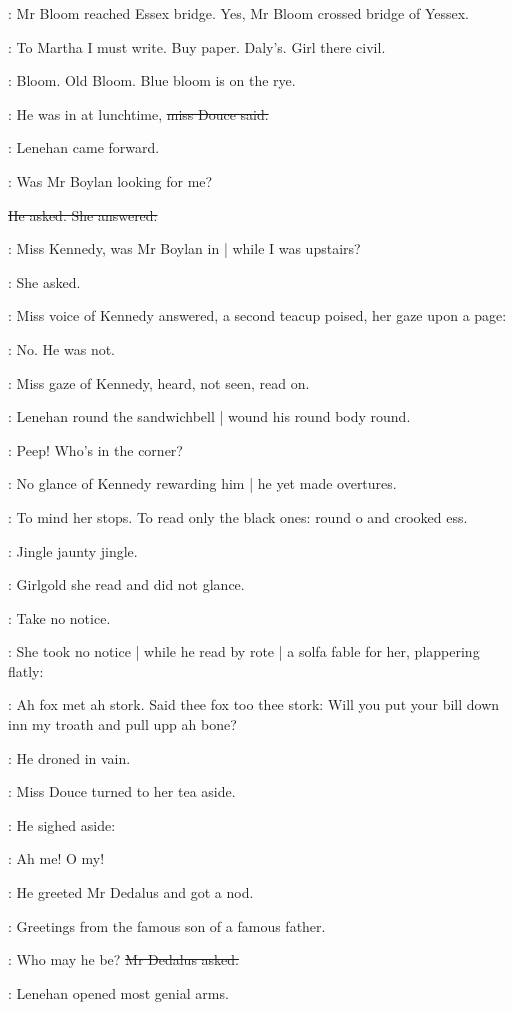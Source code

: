 :
Mr Bloom reached Essex bridge.
Yes,
Mr Bloom crossed bridge of Yessex.

\BloomInt:
To Martha I must write.
Buy paper.
Daly's.
Girl there civil.

:
Bloom.
Old Bloom.
Blue bloom is on the rye.

\MissD:
He was in at lunchtime,
\sout{miss Douce said.}

:
Lenehan came forward.

\lenehan:
Was Mr Boylan looking for me?

\sout{He asked.
She answered:}

\MissD:
Miss Kennedy,
was Mr Boylan in |
while I was upstairs?

:
She asked.

:
Miss voice of Kennedy answered,
a second teacup poised,
her gaze upon a page:

\MissK:
No.
He was not.

:
Miss gaze of Kennedy,
heard,
not seen,
read on.

:
Lenehan round the sandwichbell |
wound his round body round.

\lenehan:
Peep!
Who's in the corner?

:
No glance of Kennedy rewarding him |
he yet made overtures.

:
To mind her stops.
To read only the black ones:
round o and crooked ess.

:
Jingle jaunty jingle.

:
Girlgold she read and did not glance.

\MissK:
Take no notice.

:
She took no notice |
while he read by rote |
a solfa fable for her,
plappering flatly:

\lenehan:
Ah fox met ah stork.
Said thee fox too thee stork:
Will you put your bill down inn my troath
and pull upp ah bone?

:
He droned in vain.

:
Miss Douce turned to her tea aside.

:
He sighed aside:

\lenehan:
Ah me!
O my!

:
He greeted Mr Dedalus and got a nod.

\lenehan:
Greetings from the famous son of a famous father.

\simon:
Who may he be?
\sout{Mr Dedalus asked.}

:
Lenehan opened most genial arms.


